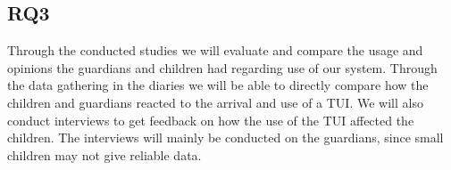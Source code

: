 \subsection{RQ3}
\label{sec: RQ3-methodology}

Through the conducted studies we will evaluate and compare the usage and opinions the guardians and children had regarding use of our system. Through the data gathering in the diaries we will be able to directly compare how the children and guardians reacted to the arrival and use of a TUI. We will also conduct interviews to get feedback on how the use of the TUI affected the children. The interviews will mainly be conducted on the guardians, since small children may not give reliable data.


